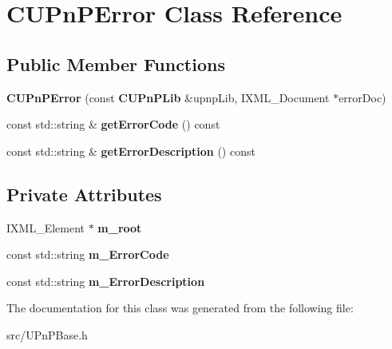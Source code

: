 \section{CUPnPError Class Reference}
\label{classCUPnPError}
\subsection*{Public Member Functions}
\begin{DoxyCompactItemize}
\item 
{\bfseries CUPnPError} (const {\bf CUPnPLib} \&upnpLib, IXML\_\-Document $\ast$errorDoc)\label{classCUPnPError_aeb0d7ba1ba0cc5ad60d42e3e79ccfaaf}

\item 
const std::string \& {\bfseries getErrorCode} () const \label{classCUPnPError_a6e7ae2a406a555997da56f38d9c34755}

\item 
const std::string \& {\bfseries getErrorDescription} () const \label{classCUPnPError_aa4351105733a7199c7ef950824aaab5c}

\end{DoxyCompactItemize}
\subsection*{Private Attributes}
\begin{DoxyCompactItemize}
\item 
IXML\_\-Element $\ast$ {\bfseries m\_\-root}\label{classCUPnPError_a2ac4ee452fb70f1f78aca8344161d441}

\item 
const std::string {\bfseries m\_\-ErrorCode}\label{classCUPnPError_a8edd7c248d19f697e928fa915bec6034}

\item 
const std::string {\bfseries m\_\-ErrorDescription}\label{classCUPnPError_a4431e3a397ecb2618f61171697659ebf}

\end{DoxyCompactItemize}


The documentation for this class was generated from the following file:\begin{DoxyCompactItemize}
\item 
src/UPnPBase.h\end{DoxyCompactItemize}
